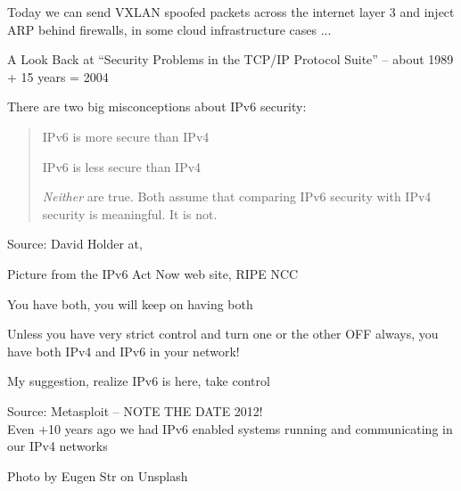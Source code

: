 \documentclass[Screen16to9,17pt]{foils}
\begin{document}
Today we can send VXLAN spoofed packets across the internet layer 3 and inject ARP behind firewalls, in some cloud infrastructure cases ...

A Look Back at “Security Problems in the TCP/IP Protocol Suite” -- about 1989 + 15 years = 2004




There are two big misconceptions about IPv6 security:

\begin{quote}
\begin{list2}
\item IPv6 is more secure than IPv4
\item IPv6 is less secure than IPv4
\end{list2}

\emph{Neither} are true. Both assume that comparing IPv6 security with IPv4 security is meaningful. It is not.
\end{quote}
Source: David Holder at, 



Picture from the IPv6 Act Now web site, RIPE NCC

\begin{list2}
\item You have both, you will keep on having both
\item Unless you have very strict control and turn one or the other OFF always, you have both IPv4 and IPv6 in your network!
\item My suggestion, realize IPv6 is here, take control
\end{list2}



Source: Metasploit -- NOTE THE DATE 2012!\\
Even +10 years ago we had IPv6 enabled systems running and communicating in our IPv4 networks




\hfill Photo by Eugen Str on Unsplash



\end{document}
